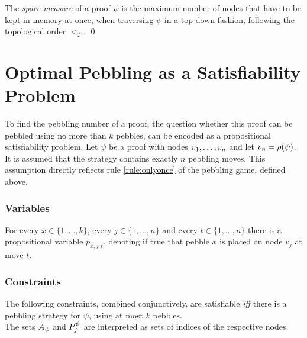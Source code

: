 \documentclass{llncs}
\begin{document}
\begin{definition}
\label{def:space measure}
The \emph{space measure} %
of a proof $\psi$ is the maximum number of nodes that have to be kept in memory at once, when traversing $\psi$ in a top-down fashion, following the topological order $<_T$.
\qed
\end{definition}


\section{Optimal Pebbling as a Satisfiability Problem}

To find the pebbling number of a proof, the question whether this proof can be pebbled using no more than $k$ pebbles, can be encoded as a propositional satisfiability problem.
Let $\psi$ be a proof with nodes $v_1,\ldots,v_n$ and let $v_n = \rho(\psi)$. It is assumed that the strategy contains exactly $n$ pebbling moves.
This assumption directly reflects rule \ref{rule:onlyonce} of the pebbling game, defined above.
\subsubsection*{Variables}
For every $x \in \{1,\ldots,k\}$, every $j \in \{1,\ldots,n\}$ and every $t \in \{1,\ldots,n\}$ there is a propositional variable $p_{x,j,t}$, denoting if true that pebble $x$ is placed on node $v_j$ at move $t$.
\subsubsection*{Constraints}
The following constraints, combined conjunctively, are satisfiable \textit{iff} there is a pebbling strategy for $\psi$, using at most $k$ pebbles.\\
The sets $A_{\psi}$ and $P_{j}^{\psi}$ are interpreted as sets of indices of the respective nodes.
\end{document}
